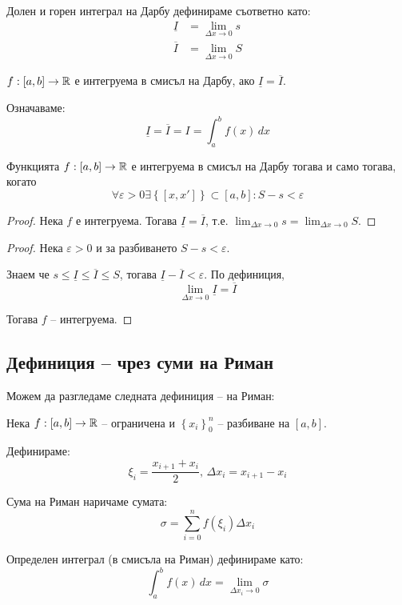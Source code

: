 \begin{definition}
    Долен и горен интеграл на Дарбу дефинираме съответно като:
    \begin{align*}
        \underline{I} & = \lim_{\Delta{x} \to 0} s \\
        \overline{I}  & = \lim_{\Delta{x} \to 0} S
    \end{align*}

\end{definition}

\begin{definition}
    $f: [a,b] \to \mathbb{R}$ е интегруема в смисъл на Дарбу, ако $\underline{I} = \overline{I}$.

    Означаваме:
    \[\underline{I} = \overline{I} = I = \int_{a}^b f(x)\,dx\]
\end{definition}

\begin{theorem}
    Функцията $f: [a,b] \to \mathbb{R}$ е интегруема в смисъл на Дарбу тогава и само тогава, когато
    \[\forall \varepsilon > 0 \exists\left\{[x,x']\right\} \subset [a,b] : S-s < \varepsilon\]

    \begin{proof}
        Нека $f$ е интегруема. Тогава $\underline{I} = \overline{I}$, т.е. $\lim_{\Delta{x} \to 0} s =  \lim_{\Delta{x} \to 0} S$.
    \end{proof}
    \begin{proof}
        Нека $\varepsilon > 0$ и за разбиването $S-s<\varepsilon$.
        
        Знаем че $s \leq \underline{I} \leq \overline{I} \leq S$, тогава $\underline{I} - \overline{I} < \varepsilon$.
        По дефиниция,
        \[\lim_{\Delta x \to 0} \underline{I} = \overline{I}\]

        Тогава $f$ -- интегруема.
    \end{proof}
\end{theorem}

\subsection{Дефиниция -- чрез суми на Риман}
Можем да разгледаме следната дефиниция -- на Риман:

\begin{definition}
    Нека $f: [a,b] \to \mathbb{R}$ -- ограничена и $\left\{x_i\right\}_0^{n}$ -- разбиване на $[a,b]$.

    Дефинираме:
    \[\xi_i = \frac{x_{i+1}+x_i}{2},\,\Delta{x_i} = x_{i+1}-x_i\]

    Сума на Риман наричаме сумата:
    \[\sigma = \sum_{i=0}^n f(\xi_i)\Delta{x_i}\]

    Определен интеграл (в смисъла на Риман) дефинираме като:
    \[\int_a^b f(x)\,dx = \lim_{\Delta x_i \to 0} \sigma\]
\end{definition}

